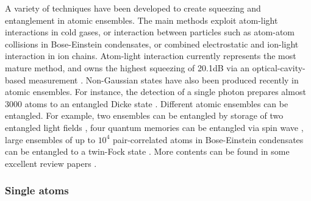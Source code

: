 \documentclass[aps, rmp, twocolumn, amsmath, amssymb, nofootinbib, superscriptaddress, longbibliography, floatfix, table-of-contents, eqsecnum]{revtex4-1}
\begin{document}
A variety of techniques have been developed to create squeezing and entanglement in atomic ensembles. The main methods exploit atom-light interactions in cold gases, or interaction between particles such as atom-atom collisions in Bose-Einstein condensates, or combined electrostatic and ion-light interaction in ion chains. Atom-light interaction currently represents the most mature method, and owns the highest squeezing of 20.1dB via an optical-cavity-based measurement \cite{hosten2016measurement}. Non-Gaussian states have also been produced recently in atomic ensembles. For instance, the detection of a single photon prepares almost 3000 atoms to an entangled Dicke state \cite{mcconnell2015entanglement}. Different atomic ensembles can be entangled. For example, two ensembles can be entangled by storage of two entangled light fields \cite{lukin2000entanglement}, four quantum memories can be entangled via spin wave \cite{choi2010entanglement}, large ensembles of up to $10^4$ pair-correlated atoms in Bose-Einstein condensates can be entangled to a twin-Fock state \cite{lucke2011twin}. More contents can be found in some excellent review papers \cite{kimble2008quantum, hammerer2010quantum, sangouard2011quantum, pezze2016non}.

%
%

\subsubsection{Single atoms} 
\end{document}
